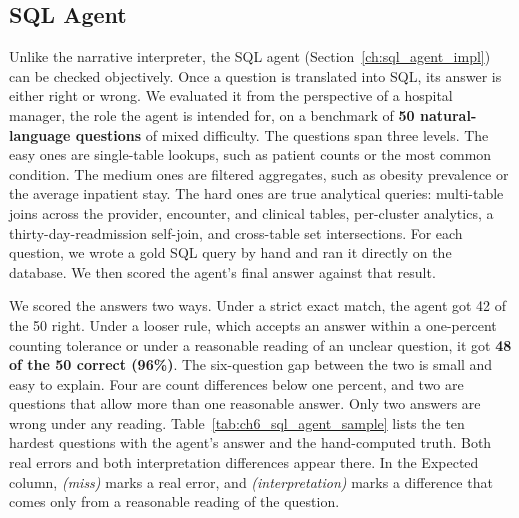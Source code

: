 \subsection{SQL Agent}
\label{ch:sql_agent_validation}

Unlike the narrative interpreter, the SQL agent (Section~\ref{ch:sql_agent_impl}) can be checked objectively. Once a question is translated into SQL, its answer is either right or wrong. We evaluated it from the perspective of a hospital manager, the role the agent is intended for, on a benchmark of \textbf{50 natural-language questions} of mixed difficulty. The questions span three levels. The easy ones are single-table lookups, such as patient counts or the most common condition. The medium ones are filtered aggregates, such as obesity prevalence or the average inpatient stay. The hard ones are true analytical queries: multi-table joins across the provider, encounter, and clinical tables, per-cluster analytics, a thirty-day-readmission self-join, and cross-table set intersections. For each question, we wrote a gold SQL query by hand and ran it directly on the database. We then scored the agent's final answer against that result.

We scored the answers two ways. Under a strict exact match, the agent got 42 of the 50 right. Under a looser rule, which accepts an answer within a one-percent counting tolerance or under a reasonable reading of an unclear question, it got \textbf{48 of the 50 correct (96\%)}. The six-question gap between the two is small and easy to explain. Four are count differences below one percent, and two are questions that allow more than one reasonable answer. Only two answers are wrong under any reading. Table~\ref{tab:ch6_sql_agent_sample} lists the ten hardest questions with the agent's answer and the hand-computed truth. Both real errors and both interpretation differences appear there. In the Expected column, \emph{(miss)} marks a real error, and \emph{(interpretation)} marks a difference that comes only from a reasonable reading of the question.

